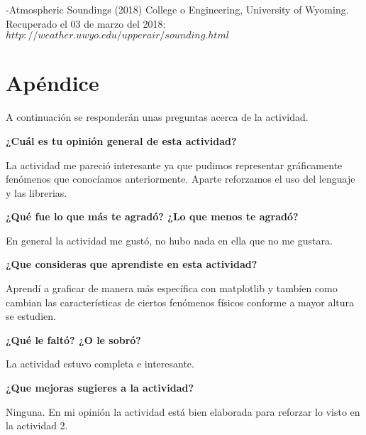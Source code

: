 \documentclass[12pt]{article}
\begin{document}
-Atmospheric Soundings (2018) College o Engineering, University of Wyoming. Recuperado el 03 de marzo del 2018: $http://weather.uwyo.edu/upperair/sounding.html$

\section{Apéndice}

A continuación se responderán unas preguntas acerca de la actividad.

\textbf{¿Cuál es tu opinión general de esta actividad?}

La actividad me pareció interesante ya que pudimos representar gráficamente fenómenos que conocíamos anteriormente. Aparte reforzamos el uso del lenguaje y las librerias.

\textbf{¿Qué fue lo que más te agradó? ¿Lo que menos te agradó?}

En general la actividad me gustó, no hubo nada en ella que no me gustara.

\textbf{¿Que consideras que aprendiste en esta actividad?}

Aprendí a graficar de manera más específica con matplotlib y tambíen como cambian las características de ciertos fenómenos físicos conforme a mayor altura se estudien.

\textbf{¿Qué le faltó? ¿O le sobró?}

La actividad estuvo completa e interesante.

\textbf{¿Que mejoras sugieres a la actividad?}

Ninguna. En mi opinión la actividad está bien elaborada para reforzar lo visto en la actividad 2.
\end{document}
